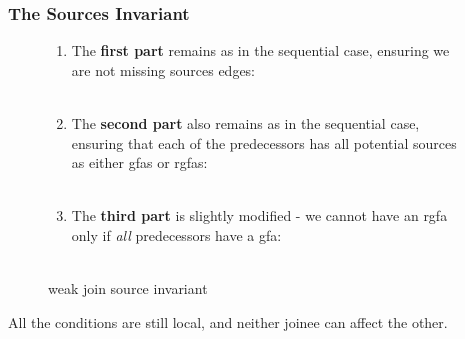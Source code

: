 \subsubsection*{The Sources Invariant}
\begin{figure}[H]
\begin{enumerate}
\item The \textbf{first part} remains as in the sequential case, ensuring we are not missing sources edges:\\
	\\
\item The \textbf{second part} also remains as in the sequential case, ensuring that each of the predecessors has all potential sources as either gfas or rgfas:\\
	\\
\item The \textbf{third part} is slightly modified - we cannot have an rgfa only if \emph{all} predecessors have a gfa:\\
	\\
\end{enumerate}
\caption{weak join source invariant}
\label{weak_join_source_invariant}
\end{figure}
All the conditions are still local, and neither joinee can affect the other.

